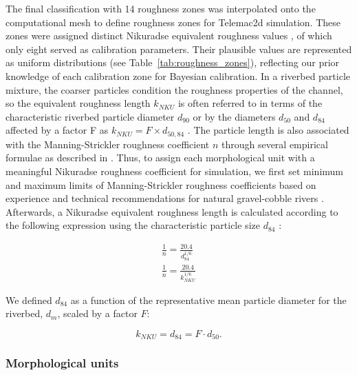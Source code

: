 The final classification with 14 roughness zones was interpolated onto the computational mesh to define roughness zones for Telemac2d simulation. These zones were assigned distinct Nikuradse equivalent roughness values , of which only eight served as calibration parameters. Their plausible values are represented as uniform distributions (see Table~\ref{tab:roughness_zones}), reflecting our prior knowledge of each calibration zone for Bayesian calibration. In a riverbed particle mixture, the coarser particles condition the roughness properties of the channel, so the equivalent roughness length $k_{NKU}$ is often referred to in terms of the characteristic riverbed particle diameter $d_{90}$ or by the diameters $d_{50}$ and $d_{84}$ affected by a factor F as $k_{NKU} = F \times d_{50,84}$ \cite{tassi2023gaia}. The particle length is also associated with the Manning-Strickler roughness coefficient $n$ through several empirical formulae as described in \cite{meyer-peter1948formulas, ferguson2007flow, rickenmann2011evaluation}. Thus, to assign each morphological unit with a meaningful Nikuradse roughness coefficient for simulation, we first set minimum and maximum limits of Manning-Strickler roughness coefficients based on experience and technical recommendations for natural gravel-cobble rivers \cite{chow1959openchannel}. Afterwards, a Nikuradse equivalent roughness length is calculated according to the following expression using the characteristic particle size $d_{84}$  \cite{rickenmann2011evaluation}:

\begin{gather}
	\frac{1}{n} = \frac{20.4}{d_{84}^{1/6}} \label{eq:mann-NIKU eq-orig} \\
	\frac{1}{n} = \frac{20.4}{k_{NKU}^{1/6}} \label{eq:mann-NIKU eq-d84}
\end{gather}

We defined $d_{84}$ as a function of the representative mean particle diameter for the riverbed, $d_{m}$, scaled by a factor $F$: 

\begin{equation} \label{eq:k-nku}
	k_{NKU} = d_{84} = F \cdot d_{50}.
\end{equation}

\subsubsection{Morphological units}
\label{subsec:calibration-parameters}

\cite{schwindt2016physical}

